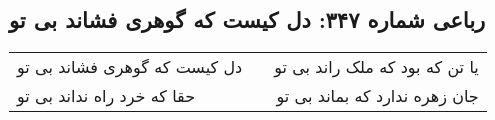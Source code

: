 \begin{center}
\section*{رباعی شماره ۳۴۷: دل کیست که گوهری فشاند بی تو}
\label{sec:sh347}
\begin{longtable}{l p{0.5cm} r}
دل کیست که گوهری فشاند بی تو
&&
یا تن که بود که ملک راند بی تو
\\
حقا که خرد راه نداند بی تو
&&
جان زهره ندارد که بماند بی تو
\\
\end{longtable}
\end{center}
